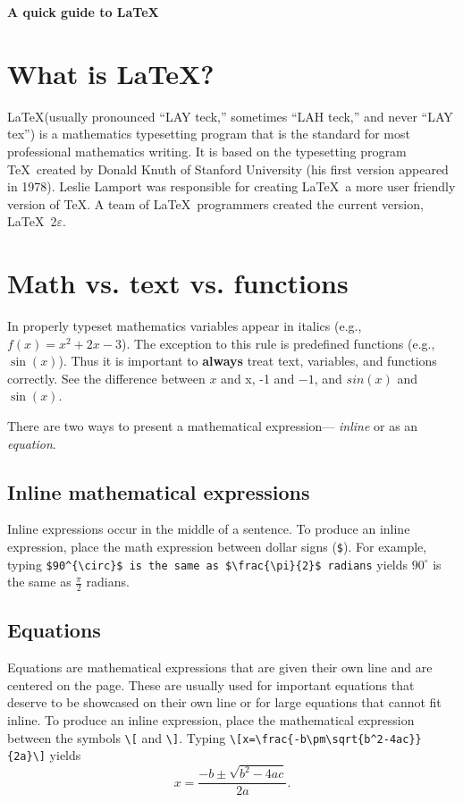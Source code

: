 \begin{center}
     \Large{\textbf{A quick guide to \LaTeX}} \\
\end{center}
\begin{multicols}{3}
\setlength{\premulticols}{1pt}
\setlength{\postmulticols}{1pt}
\setlength{\multicolsep}{1pt}
\setlength{\columnsep}{2pt}

\section{What is \LaTeX?}
\LaTeX (usually pronounced ``LAY teck,'' sometimes ``LAH teck,'' and never ``LAY tex'') is a mathematics typesetting program that is the standard for most professional mathematics writing. It is based on the typesetting program \TeX\ created by Donald Knuth of Stanford University (his first version appeared in 1978). Leslie Lamport was responsible for creating \LaTeX\, a more user friendly version of \TeX. A team of \LaTeX\ programmers created the current version,  \LaTeX\ 2$\varepsilon$.

\section{Math vs. text vs. functions}
In properly typeset mathematics  variables appear in italics (e.g., $f(x)=x^{2}+2x-3$). The exception to this rule is predefined functions (e.g., $\sin (x)$). Thus it is important to \textbf{always} treat text, variables, and functions correctly. See the difference between $x$ and x, -1 and $-1$, and $sin(x)$ and $\sin(x)$.  

There are two ways to present a mathematical expression--- \emph{inline} or as an \emph{equation}.

\subsection{Inline mathematical expressions}
Inline expressions occur in the middle of a sentence.  To produce an inline expression, place the math expression between dollar signs (\verb!$!).  For example, typing \verb!$90^{\circ}$ is the same as $\frac{\pi}{2}$ radians!  yields $90^{\circ}$ is the same as $\frac{\pi}{2}$ radians.

\subsection{Equations}
Equations are mathematical expressions that are given their own line and are centered on the page.  These are usually used for important equations that deserve to be showcased on their own line or for large equations that cannot fit inline. To produce an inline expression, place the mathematical expression  between the symbols  \verb!\[! and \verb!\]!. Typing \verb!\[x=\frac{-b\pm\sqrt{b^2-4ac}}{2a}\]! yields \[x=\frac{-b\pm\sqrt{b^2-4ac}}{2a}.\]
 

\end{multicols}
